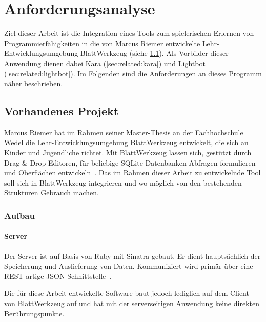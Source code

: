 \chapter{Anforderungsanalyse}
\label{sec:requirements}

Ziel dieser Arbeit ist die Integration eines Tools zum spielerischen Erlernen von Programmierfähigkeiten in die von Marcus Riemer entwickelte Lehr-Entwicklungsumgebung BlattWerkzeug (siehe \ref{sec:requirements:existing}). Als Vorbilder dieser Anwendung dienen dabei Kara (\ref{sec:related:kara}) und Lightbot (\ref{sec:related:lightbot}). Im Folgenden sind die Anforderungen an dieses Programm näher beschrieben.

\section{Vorhandenes Projekt}
\label{sec:requirements:existing}

Marcus Riemer hat im Rahmen seiner Master-Thesis an der Fachhochschule Wedel die Lehr-Entwicklungsumgebung BlattWerkzeug entwickelt, die sich an Kinder und Jugendliche richtet. Mit BlattWerkzeug lassen sich, gestützt durch Drag \& Drop-Editoren, für beliebige SQLite-Datenbanken Abfragen formulieren und Oberflächen entwickeln~\cite[2]{riemer2016}. Das im Rahmen dieser Arbeit zu entwickelnde Tool soll sich in BlattWerkzeug integrieren und wo möglich von den bestehenden Strukturen Gebrauch machen.

\subsection{Aufbau}

\subsubsection{Server}

Der Server ist auf Basis von Ruby mit Sinatra gebaut. Er dient hauptsächlich der Speicherung und Auslieferung von Daten. Kommuniziert wird primär über eine REST-artige JSON-Schnittstelle~\cite[94]{riemer2016}.

Die für diese Arbeit entwickelte Software baut jedoch lediglich auf dem Client von BlattWerkzeug auf und hat mit der serverseitigen Anwendung keine direkten Berührungspunkte.

